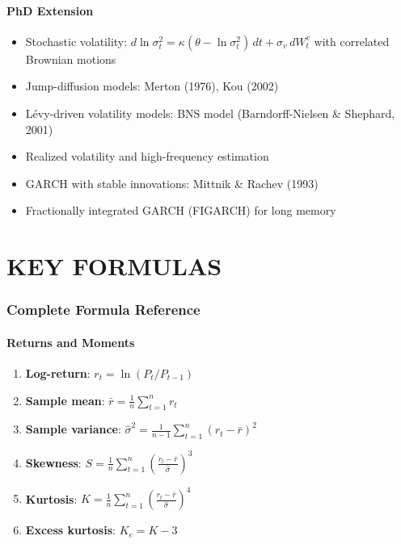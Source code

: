 \documentclass[11pt, a4paper]{article}
\theoremstyle{definition}
\begin{document}
\subsection{PhD Extension}
\begin{itemize}
  \item Stochastic volatility: $d\ln\sigma_t^2 = \kappa(\theta - \ln\sigma_t^2)\,dt + \sigma_v\,dW_t^v$ with correlated Brownian motions
  \item Jump-diffusion models: Merton (1976), Kou (2002)
  \item Lévy-driven volatility models: BNS model (Barndorff-Nielsen \& Shephard, 2001)
  \item Realized volatility and high-frequency estimation
  \item GARCH with stable innovations: Mittnik \& Rachev (1993)
  \item Fractionally integrated GARCH (FIGARCH) for long memory
\end{itemize}


\part{KEY FORMULAS}

\section{Complete Formula Reference}

\subsection{Returns and Moments}

\begin{enumerate}
  \item \textbf{Log-return}: $r_t = \ln(P_t / P_{t-1})$

  \item \textbf{Sample mean}: $\bar{r} = \frac{1}{n}\sum_{t=1}^n r_t$

  \item \textbf{Sample variance}: $\hat{\sigma}^2 = \frac{1}{n-1}\sum_{t=1}^n (r_t - \bar{r})^2$

  \item \textbf{Skewness}: $S = \frac{1}{n}\sum_{t=1}^n \left(\frac{r_t - \bar{r}}{\hat{\sigma}}\right)^3$

  \item \textbf{Kurtosis}: $K = \frac{1}{n}\sum_{t=1}^n \left(\frac{r_t - \bar{r}}{\hat{\sigma}}\right)^4$

  \item \textbf{Excess kurtosis}: $K_e = K - 3$
\end{enumerate}
\end{document}
